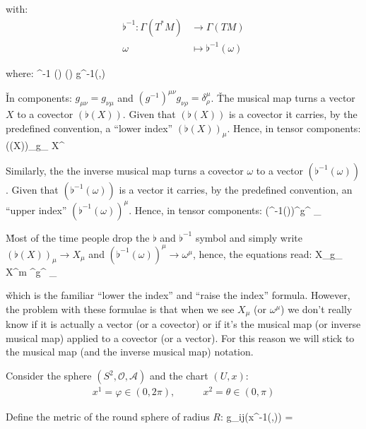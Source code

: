 with:
\begin{align*}
\flat^{-1} : \Gamma(T^*M) & \to \Gamma(TM) \\ \omega & \mapsto \flat^{-1} (\omega)
\end{align*}

where:
\bse
\flat^{-1} (\omega) (\sigma) \coloneqq g^{-1}(\omega,\sigma)
\ese
\ed

\v

In components: $g_{\mu \nu} = g_{\nu \mu}$ and $(g^{-1})^{\mu \nu} g_{\nu \rho} = \delta^\mu_\rho$. \v

The musical map turns a vector $X$ to a covector $(\flat(X))$. Given that $ (\flat(X))$ is a covector it carries, by
the predefined convention, a ``lower index'' $(\flat(X))_\mu$. Hence, in tensor components:
\bse
(\flat(X))_\mu \coloneqq g_{\mu \nu} X^\nu
\ese

Similarly, the the inverse musical map turns a covector $\omega$ to a vector $(\flat^{-1}(\omega))$. Given that $
(\flat^{-1}(\omega))$ is a vector it carries, by the predefined convention, an ``upper index'' $(\flat^{-1}(\omega))
^\mu$. Hence, in tensor components:
\bse
(\flat^{-1}(\omega))^\mu \coloneqq g^{\mu \nu} \omega_\nu
\ese

\v

Most of the time people drop the $\flat$ and $\flat^{-1}$ symbol and simply write $(\flat(X))_\mu \rightarrow X_\mu$
and $(\flat^{-1}(\omega))^\mu \rightarrow \omega^\mu$, hence, the equations read:
\bse
X_\mu \coloneqq g_{\mu \nu} X^m \qquad {} \qquad \omega^\mu \coloneqq g^{\mu \nu} \omega_\nu
\ese

\v

which is the familiar ``lower the index'' and ``raise the index'' formula. However, the problem with these formulae is
that when we see $X_\mu$ (or $\omega^\mu$) we don't really know if it is actually a vector (or a covector) or if it's
the musical map (or inverse musical map) applied to a covector (or a vector). For this reason we will stick to the
musical map (and the inverse musical map) notation.

\be
Consider the sphere $(S^2, \mathcal{O}, \mathscr{A})$ and the chart $(U,x)$:
\begin{align*}
x^1 = \varphi \in (0,2\pi), & \quad \quad x^2 = \theta \in (0,\pi)
\end{align*}

Define the metric of the round sphere of radius $R$:
\bse
g_{ij}(x^{-1}(\theta,\varphi)) = 
\ese

